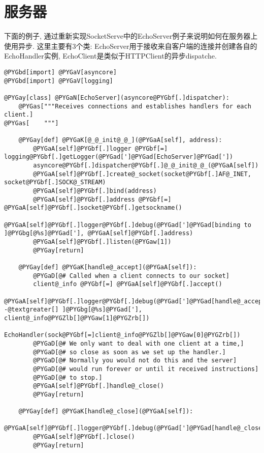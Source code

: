 \documentclass[a4paper,10pt,english]{manual}
\begin{document}
\section{服务器}

下面的例子, 通过重新实现SocketServe中的EchoServer例子来说明如何在服务器上使用异步. 这里主要有3个类: EchoServer用于接收来自客户端的连接并创建各自的EchoHandler实例, EchoClient是类似于HTTPClient的异步dispatche.

\begin{Verbatim}[commandchars=@\[\]]
@PYGbd[import] @PYGaV[asyncore]
@PYGbd[import] @PYGaV[logging]

@PYGay[class] @PYGaN[EchoServer](asyncore@PYGbf[.]dispatcher):
    @PYGas["""Receives connections and establishes handlers for each client.]
@PYGas[    """]

    @PYGay[def] @PYGaK[@_@_init@_@_](@PYGaA[self], address):
        @PYGaA[self]@PYGbf[.]logger @PYGbf[=] logging@PYGbf[.]getLogger(@PYGad[']@PYGad[EchoServer]@PYGad['])
        asyncore@PYGbf[.]dispatcher@PYGbf[.]@_@_init@_@_(@PYGaA[self])
        @PYGaA[self]@PYGbf[.]create@_socket(socket@PYGbf[.]AF@_INET, socket@PYGbf[.]SOCK@_STREAM)
        @PYGaA[self]@PYGbf[.]bind(address)
        @PYGaA[self]@PYGbf[.]address @PYGbf[=] @PYGaA[self]@PYGbf[.]socket@PYGbf[.]getsockname()
        @PYGaA[self]@PYGbf[.]logger@PYGbf[.]debug(@PYGad[']@PYGad[binding to ]@PYGbg[@%s]@PYGad['], @PYGaA[self]@PYGbf[.]address)
        @PYGaA[self]@PYGbf[.]listen(@PYGaw[1])
        @PYGay[return]

    @PYGay[def] @PYGaK[handle@_accept](@PYGaA[self]):
        @PYGaD[@# Called when a client connects to our socket]
        client@_info @PYGbf[=] @PYGaA[self]@PYGbf[.]accept()
        @PYGaA[self]@PYGbf[.]logger@PYGbf[.]debug(@PYGad[']@PYGad[handle@_accept() -@textgreater[] ]@PYGbg[@%s]@PYGad['], client@_info@PYGZlb[]@PYGaw[1]@PYGZrb[])
        EchoHandler(sock@PYGbf[=]client@_info@PYGZlb[]@PYGaw[0]@PYGZrb[])
        @PYGaD[@# We only want to deal with one client at a time,]
        @PYGaD[@# so close as soon as we set up the handler.]
        @PYGaD[@# Normally you would not do this and the server]
        @PYGaD[@# would run forever or until it received instructions]
        @PYGaD[@# to stop.]
        @PYGaA[self]@PYGbf[.]handle@_close()
        @PYGay[return]

    @PYGay[def] @PYGaK[handle@_close](@PYGaA[self]):
        @PYGaA[self]@PYGbf[.]logger@PYGbf[.]debug(@PYGad[']@PYGad[handle@_close()]@PYGad['])
        @PYGaA[self]@PYGbf[.]close()
        @PYGay[return]


\end{Verbatim}
\end{document}
